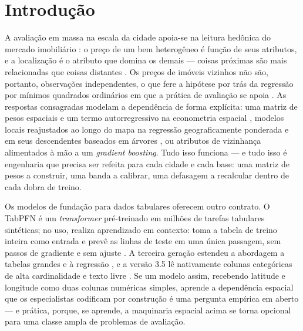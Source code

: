 \documentclass[11pt,a4paper]{article}
\begin{document}
\section{Introdução}
\label{sec:intro}

A avaliação em massa na escala da cidade apoia-se na leitura hedônica do mercado imobiliário
\citep{rosen1974}: o preço de um bem heterogêneo é função de seus atributos, e a localização é
o atributo que domina os demais --- coisas próximas são mais relacionadas que coisas distantes
\citep{tobler1970}. Os preços de imóveis vizinhos não são, portanto, observações independentes,
o que fere a hipótese por trás da regressão por mínimos quadrados ordinários em que a prática
de avaliação se apoia \citep{anselin1988}. As respostas consagradas modelam a dependência de
forma explícita: uma matriz de pesos espaciais e um termo autorregressivo na econometria
espacial \citep{anselin1988,lesage2009}, modelos locais reajustados ao longo do mapa na
regressão geograficamente ponderada \citep{fotheringham2002} e em seus descendentes baseados em
árvores \citep{grekousis2025}, ou atributos de vizinhança alimentados à mão a um
\emph{gradient boosting}. Tudo isso funciona --- e tudo isso é engenharia que precisa ser
refeita para cada cidade e cada base: uma matriz de pesos a construir, uma banda a calibrar,
uma defasagem a recalcular dentro de cada dobra de treino.

Os modelos de fundação para dados tabulares oferecem outro contrato. O TabPFN é um
\emph{transformer} \citep{vaswani2017} pré-treinado em milhões de tarefas tabulares sintéticas;
no uso, realiza aprendizado em contexto: toma a tabela de treino inteira como entrada e prevê
as linhas de teste em uma única passagem, sem passos de gradiente e sem ajuste
\citep{hollmann2023tabpfn,hollmann2025nature}. A terceira geração estendeu a abordagem a
tabelas grandes e à regressão \citep{priorlabs2026tabpfn3}, e a versão 3.5 lê nativamente
colunas categóricas de alta cardinalidade e texto livre \citep{priorlabs2026tabpfn35}. Se um
modelo assim, recebendo latitude e longitude como duas colunas numéricas simples, aprende a
dependência espacial que os especialistas codificam por construção é uma pergunta empírica em
aberto --- e prática, porque, se aprende, a maquinaria espacial acima se torna opcional para
uma classe ampla de problemas de avaliação.
\end{document}
